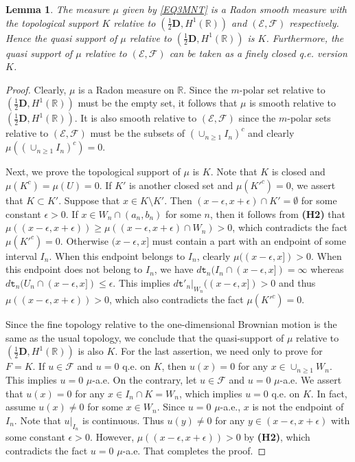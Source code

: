\documentclass[a4paper]{amsart}
\newtheorem{lemma}[theorem]{Lemma}
\theoremstyle{definition}
\theoremstyle{remark}
\numberwithin{equation}{section}
\begin{document}
\begin{lemma}\label{LM46}
The measure $\mu$ given by \eqref{EQ3MNT} is a Radon smooth measure with the topological support $K$ relative to $(\frac{1}{2}\mathbf{D},H^1(\mathbb{R}))$ and $({{\mathcal{E}}},{{\mathcal{F}}})$ respectively. Hence the quasi support of $\mu$ relative to $(\frac{1}{2}\mathbf{D},H^1(\mathbb{R}))$ is $K$. Furthermore, the quasi support of $\mu$ relative to $({{\mathcal{E}}},{{\mathcal{F}}})$ can be taken as a finely closed q.e. version $K$.
\end{lemma}
\begin{proof}
Clearly, $\mu$ is a Radon measure on $\mathbb{R}$. Since the $m$-polar set relative to $(\frac{1}{2}\mathbf{D},H^1(\mathbb{R}))$ must be the empty set, it follows that $\mu$ is smooth relative to $(\frac{1}{2}\mathbf{D},H^1(\mathbb{R}))$. It is also smooth relative to $({{\mathcal{E}}},{{\mathcal{F}}})$ since the $m$-polar sets relative to $({{\mathcal{E}}},{{\mathcal{F}}})$ must be the subsets of $\left(\cup_{n\geq 1}I_n\right)^c$ and clearly $\mu\left(\left(\cup_{n\geq 1}I_n\right)^c\right)=0$.

Next, we prove the topological support of $\mu$ is $K$. Note that $K$ is closed and $\mu(K^c)=\mu(U)=0$. If $K'$ is another closed set and $\mu(K'^c)=0$, we assert that $K\subset K'$. Suppose that $x\in K\setminus K'$. Then $(x-\epsilon,x+\epsilon)\cap K'=\emptyset$ for some constant $\epsilon>0$. If $x\in W_n\cap (a_n,b_n)$ for some $n$, then it follows from \textbf{(H2)} that $\mu((x-\epsilon,x+\epsilon))\geq \mu((x-\epsilon,x+\epsilon)\cap W_n)>0$, which contradicts the fact $\mu(K'^c)=0$. Otherwise $(x-\epsilon, x]$ must contain a part with an endpoint of some interval $I_n$. When this endpoint belongs to $I_n$, clearly $\mu((x-\epsilon,x])>0$. When this endpoint does not belong to $I_n$, we have $d{{\mathtt{t}}}_n(I_n\cap (x-\epsilon, x])=\infty$ whereas $d{{\mathtt{t}}}_n(U_n\cap (x-\epsilon, x])\leq \epsilon$. This implies $d{{\mathtt{t}}}'_n|_{W_n}((x-\epsilon,x])>0$ and thus $\mu((x-\epsilon, x+\epsilon))>0$, which also contradicts the fact $\mu(K'^c)=0$.

Since the fine topology relative to the one-dimensional Brownian motion is the same as the usual topology, we conclude that the quasi-support of $\mu$ relative to $(\frac{1}{2}\mathbf{D},H^1(\mathbb{R}))$ is also $K$. For the last assertion, we need only to prove \cite[Theorem~3.3.5~(b)]{CF12} for $F=K$. If $u\in {{\mathcal{F}}}$ and $u=0$ q.e. on $K$, then $u(x)=0$ for any $x\in \cup_{n\geq 1}W_n$. This implies $u=0$ $\mu$-a.e. On the contrary, let $u\in {{\mathcal{F}}}$ and $u=0$ $\mu$-a.e. We assert that $u(x)=0$ for any $x\in I_n\cap K=W_n$, which implies $u=0$ q.e. on $K$. In fact, assume $u(x)\neq 0$ for some $x\in W_n$. Since $u=0$ $\mu$-a.e., $x$ is not the endpoint of $I_n$. Note that $u|_{I_n}$ is continuous. Thus $u(y)\neq 0$ for any $y\in (x-\epsilon, x+\epsilon)$ with some constant $\epsilon>0$. However, $\mu((x-\epsilon,x+\epsilon))>0$ by \textbf{(H2)}, which contradicts the fact $u=0$ $\mu$-a.e. That completes the proof.
\end{proof}
\end{document}
